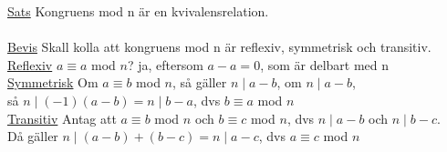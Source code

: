\documentclass{article}
\begin{document}
    \underline{Sats} Kongruens mod n är en kvivalensrelation.\\\\
    \underline{Bevis} Skall kolla att kongruens mod n är reflexiv, symmetrisk och transitiv.\\
    \indent \underline{Reflexiv} $a\equiv a$ mod $n$? ja, eftersom $a-a=0$, som är delbart med n\\
    \indent \underline{Symmetrisk} Om $a\equiv b$ mod $n$, 
    så gäller $n\mid a-b$, om $n\mid a-b$,
     \\\indent så $n\mid (-1)(a-b)=n\mid b-a$, dvs $b\equiv a$ mod $n$\\
    \indent \underline{Transitiv} Antag att $a\equiv b$ mod $n$ och $b\equiv c$ mod $n$, 
    dvs $n\mid a-b$ och $n\mid b-c$.
    \\\indent Då gäller $n\mid (a-b)+(b-c)=n\mid a-c$, dvs $a\equiv c$ mod $n$\\\\
\end{document}
